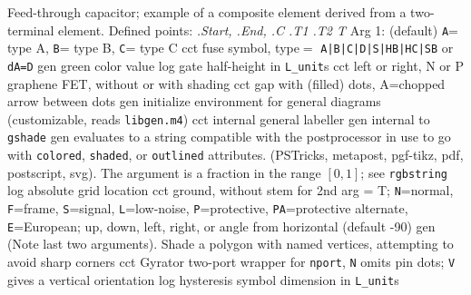   {Feed-through capacitor; example of a composite element derived from
   a two-terminal element.  Defined points: {\sl .Start, .End, .C .T1 .T2 T}
   Arg 1: (default) {\tt A}= type A, {\tt B}= type B, {\tt C}= type C 
   }
  {cct}
  {fuse symbol, type$=$
  {\tt  A|B|C|D|S|HB|HC|SB} or {\tt dA=D}}
%
  {gen}
  {green color value}
  {log}
  {gate half-height in {\tt L\_unit}s}
  {cct}
  {left or right, N or P graphene FET, without or with shading
    }
  {cct}
  {gap with (filled) dots, A=chopped arrow between dots}
  {gen}
  {initialize environment for general diagrams
    (customizable, reads {\tt libgen.m4})}
  {cct}
  {internal general labeller}
  {gen}
  {internal to {\tt gshade}}
  {gen}
  {evaluates to a string compatible with the postprocessor in use
   to go with {\tt colored}, {\tt shaded}, or {\tt outlined} attributes.
   (PSTricks, metapost, pgf-tikz, pdf, postscript, svg).
   The argument is a fraction in the range $[0,1]$; see {\tt rgbstring}}
  {log}
  {absolute grid location}
  {cct}
  { ground, without stem for 2nd arg = T;
    {\tt N}=normal, {\tt F}=frame, {\tt S}=signal, {\tt L}=low-noise,
    {\tt P}=protective,
    {\tt PA}=protective alternate,
    {\tt E}=European; up, down, left, right, or angle
    from horizontal (default -90) 
   }
  {gen}
  {(Note last two arguments).  Shade a polygon with named
    vertices, attempting to avoid sharp corners}
  {cct}
  {Gyrator two-port wrapper for {\tt nport}, {\tt N} omits pin dots; {\tt V}
   gives a vertical orientation
   }
%
  {log}
  {hysteresis symbol dimension in {\tt L\_unit}s}
